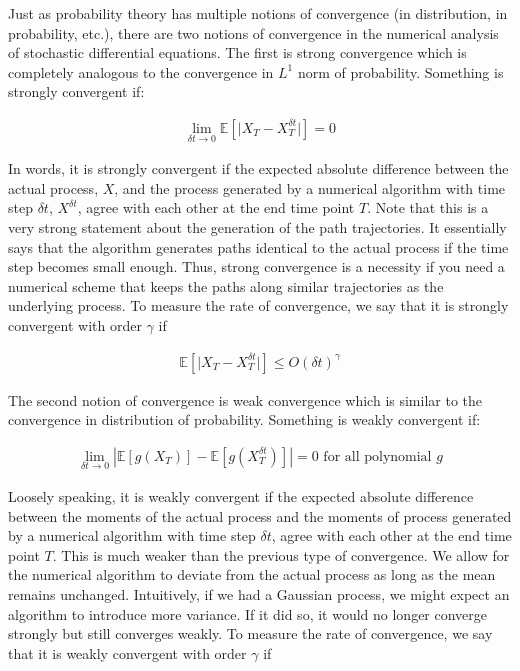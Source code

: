 \documentclass[onecolumn,notitlepage,pra,10pt,aps]{revtex4-1}
\begin{document}
Just as probability theory has multiple notions of convergence (in distribution, in probability, etc.), there are two notions of convergence in the numerical analysis of stochastic differential equations. The first is strong convergence which is completely analogous to the convergence in $L^1$ norm of probability. Something is strongly convergent if:

\begin{gather*}
  \lim_{\delta t \rightarrow 0} \mathbb{E} \left[ \lvert X_T - X_T^{\delta t} \rvert \right] = 0
\end{gather*}

In words, it is strongly convergent if the expected absolute difference between the actual process, $X$, and the process generated by a numerical algorithm with time step $\delta t$, $X^{\delta t}$,  agree with each other at the end time point $T$. Note that this is a very strong statement about the generation of the path trajectories. It essentially says that the algorithm generates paths identical to the actual process if the time step becomes small enough. Thus, strong convergence is a necessity if you need a numerical scheme that keeps the paths along similar trajectories as the underlying process. To measure the rate of convergence, we say that it is strongly convergent with order $\gamma$ if

\begin{gather*}
  \mathbb{E} \left[ \lvert X_T - X_T^{\delta t} \rvert \right] \leq O(\delta t)^\gamma
\end{gather*}

The second notion of convergence is weak convergence which is similar to the convergence in distribution of probability. Something is weakly convergent if:

\begin{gather*}
  \lim_{\delta t \rightarrow 0} \left\lvert \mathbb{E} \left[ g(X_T) \right] - \mathbb{E} \left[ g(X_T^{\delta t}) \right] \right\lvert = 0 \text{ for all polynomial } g
\end{gather*}

Loosely speaking, it is weakly convergent if the expected absolute difference between the moments of the actual process and the moments of process generated by a numerical algorithm with time step $\delta t$, agree with each other at the end time point $T$. This is much weaker than the previous type of convergence. We allow for the numerical algorithm to deviate from the actual process as long as the mean remains unchanged. Intuitively, if we had a Gaussian process, we might expect an algorithm to introduce more variance. If it did so, it would no longer converge strongly but still converges weakly. To measure the rate of convergence, we say that it is weakly convergent with order $\gamma$ if
\end{document}
